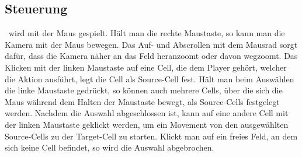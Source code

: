 \subsection{Steuerung}
\vires\ wird mit der Maus gespielt. Hält man die rechte Maustaste, so kann man die Kamera mit der Maus bewegen. Das Auf- und Abscrollen mit dem Mausrad sorgt dafür, dass die Kamera näher an das Feld heranzoomt oder davon wegzoomt. Das Klicken mit der linken Maustaste auf eine Cell, die dem Player gehört, welcher die Aktion ausführt, legt die Cell als Source-Cell fest. Hält man beim Auswählen die linke Maustaste gedrückt, so können auch mehrere Cells, über die sich die Maus während dem Halten der Maustaste bewegt, als Source-Cells festgelegt werden. Nachdem die Auswahl abgeschlossen ist, kann auf eine andere Cell mit der linken Maustaste geklickt werden, um ein Movement von den ausgewählten Source-Cells zu der Target-Cell zu starten. Klickt man auf ein freies Feld, an dem sich keine Cell befindet, so wird die Auswahl abgebrochen.
